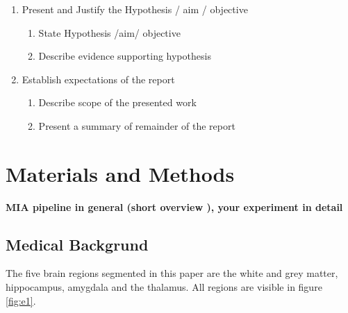 \documentclass[journal]{IEEEtran}
\begin{document}
{\begin{enumerate}
		\begin{enumerate}
		\item Explain what is the state of the art / current practice
		\item Explain what preliminary / related work has been done towards solving the problem by you and others
		\item Explain what deficiencies / problems still exist (specifically the one that you will try to address)
		\end{enumerate}
	\item Present and Justify the Hypothesis / aim / objective
		\begin{enumerate}
		\item State Hypothesis /aim/ objective
		\item Describe evidence supporting hypothesis
		\end{enumerate}
	\item Establish expectations of the report
		\begin{enumerate}
		\item Describe scope of the presented work
		\item Present a summary of remainder of the report\\
		\end{enumerate}
	\end{enumerate} 
}



\section{Materials and Methods}
\textbf{MIA pipeline in general (short overview ), your experiment in detail}
\subsection{Medical Backgrund}
	The five brain regions segmented in this paper are the white and grey matter, hippocampus, amygdala and the thalamus. All regions are visible in figure \ref{fig:e1}.
\end{document}
